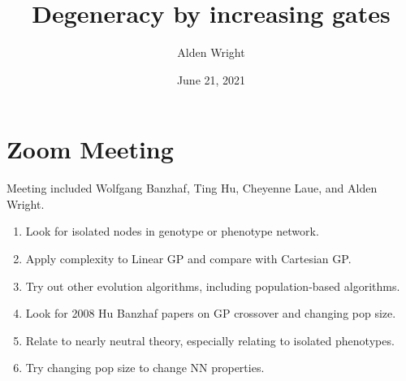 \documentclass{article}
\title{Degeneracy by increasing gates}
\author{Alden Wright }
\date{June 21, 2021}
\begin{document}
\maketitle

\section{Zoom Meeting }
Meeting included Wolfgang Banzhaf, Ting Hu, Cheyenne Laue, and Alden Wright.
\begin{enumerate}
\item Look for isolated nodes in genotype or phenotype network.
\item Apply complexity to Linear GP and compare with Cartesian GP.
\item Try out other evolution algorithms, including population-based algorithms.
\item Look for 2008 Hu Banzhaf papers on GP crossover and changing pop size.
\item Relate to nearly neutral theory, especially relating to isolated phenotypes. 
\item Try changing pop size to change NN properties.
\end{enumerate}







\end{document}
